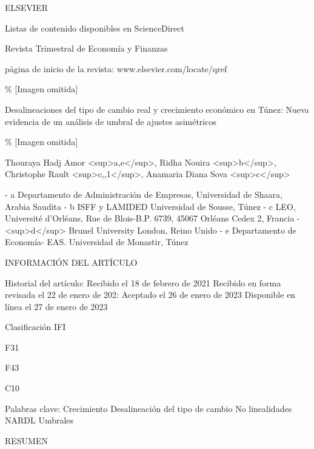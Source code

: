 \documentclass[11pt,a4paper]{article}
\begin{document}
ELSEVIER

Listas de contenido disponibles en ScienceDirect

Revista Trimestral de Economía y Finanzas

página de inicio de la revista: www.elsevier.com/locate/qref

\% [Imagen omitida]

Desalineaciones del tipo de cambio real y crecimiento económico en Túnez: Nueva evidencia de un análisis de umbral de ajustes asimétricos\*

\% [Imagen omitida]

Thouraya Hadj Amor <sup>a,e</sup>, Ridha Nouira <sup>b</sup>, Christophe Rault <sup>c,\*,1</sup>, Anamaria Diana Sova <sup>c</sup>

- a Departamento de Administración de Empresas, Universidad de Shaara, Arabia Saudita
- b ISFF y LAMIDED Universidad de Sousse, Túnez
- c LEO, Université d'Orléans, Rue de Blois-B.P. 6739, 45067 Orléans Cedex 2, Francia
- <sup>d</sup> Brunel University London, Reino Unido
- e Departamento de Economía- EAS. Universidad de Monastir, Túnez

INFORMACIÓN DEL ARTÍCULO

Historial del artículo:
Recibido el 18 de febrero de 2021
Recibido en forma revisada el 22 de enero de 202:
Aceptado el 26 de enero de 2023
Disponible en línea el 27 de enero de 2023

Clasificación IFI

F31

F43

C10

Palabras clave: Crecimiento Desalineación del tipo de cambio No linealidades NARDL Umbrales

RESUMEN
\end{document}
